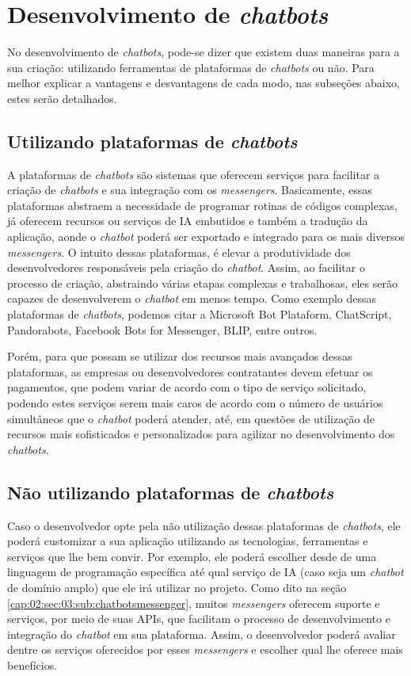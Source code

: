 \section{Desenvolvimento de \textit{chatbots}}

No desenvolvimento de \textit{chatbots}, pode-se dizer que existem duas maneiras para a sua criação: utilizando ferramentas de plataformas de \textit{chatbots} ou não. Para melhor explicar a vantagens e desvantagens de cada modo, nas subseções abaixo, estes serão detalhados.

\subsection{Utilizando plataformas de \textit{chatbots}}

A plataformas de \textit{chatbots} são sistemas que oferecem serviços para facilitar a criação de \textit{chatbots} e sua integração com os  \textit{messengers}.
Basicamente, essas plataformas abstraem a necessidade de programar rotinas de códigos complexas, já oferecem recursos ou serviços de IA embutidos e também a tradução da aplicação, aonde o \textit{chatbot} poderá ser exportado e integrado para os mais diversos \textit{messengers}.
O intuito dessas plataformas, é elevar a produtividade dos desenvolvedores responsáveis pela criação do \textit{chatbot}.
Assim, ao facilitar o processo de criação, abstraindo várias etapas complexas e trabalhosas, eles serão capazes de desenvolverem o \textit{chatbot} em menos tempo.
Como exemplo dessas plataformas de \textit{chatbots}, podemos citar a Microsoft Bot Plataform, ChatScript, Pandorabots, Facebook Bots for Messenger, BLIP, entre outros.

Porém, para que possam se utilizar dos recursos mais avançados dessas plataformas, as empresas ou desenvolvedores contratantes devem efetuar os pagamentos, que podem variar de acordo com o tipo de serviço solicitado, podendo estes serviços serem mais caros de acordo com o número de usuários simultâneos que o \textit{chatbot} poderá atender, até, em questões de utilização de recursos mais sofisticados e personalizados para agilizar no desenvolvimento dos \textit{chatbots}. 


\subsection{Não utilizando plataformas de \textit{chatbots}}

Caso o desenvolvedor opte pela não utilização dessas plataformas de \textit{chatbots}, ele poderá customizar a sua aplicação utilizando as tecnologias, ferramentas e serviços que lhe bem convir.
Por exemplo, ele poderá escolher desde de uma linguagem de programação específica até qual serviço de IA (caso seja um \textit{chatbot} de domínio amplo) que ele irá utilizar no projeto.
Como dito na seção \ref{cap:02:sec:03:sub:chatbotsmessenger}, muitos \textit{messengers} oferecem suporte e serviços, por meio de suas APIs, que facilitam o processo de desenvolvimento e integração do \textit{chatbot} em sua plataforma. Assim, o desenvolvedor poderá avaliar dentre os serviços oferecidos por esses \textit{messengers} e escolher qual lhe oferece mais benefícios.

